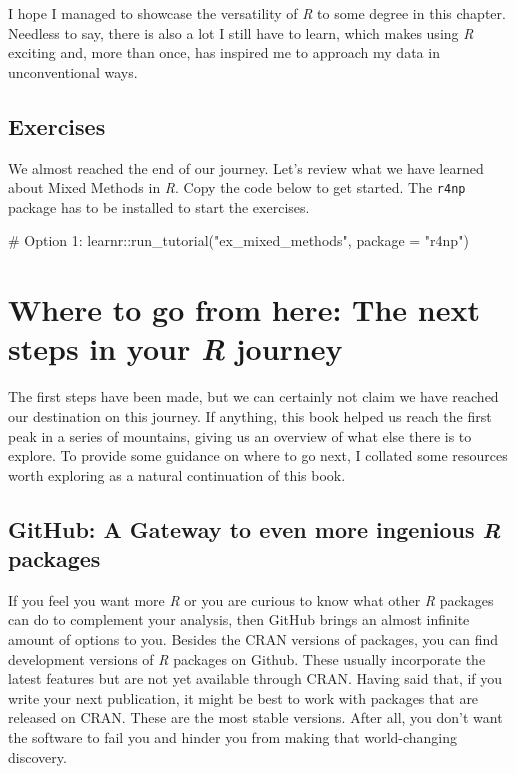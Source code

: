 \documentclass[
  letterpaper,
]{krantz}
\makeatletter
\newenvironment{Shaded}{\begin{snugshade}}{\end{snugshade}}
\newcommand{\AttributeTok}[1]{\textcolor[rgb]{0.40,0.45,0.13}{#1}}
\newcommand{\CommentTok}[1]{\textcolor[rgb]{0.37,0.37,0.37}{#1}}
\newcommand{\FunctionTok}[1]{\textcolor[rgb]{0.28,0.35,0.67}{#1}}
\newcommand{\NormalTok}[1]{\textcolor[rgb]{0.00,0.23,0.31}{#1}}
\newcommand{\SpecialCharTok}[1]{\textcolor[rgb]{0.37,0.37,0.37}{#1}}
\newcommand{\StringTok}[1]{\textcolor[rgb]{0.13,0.47,0.30}{#1}}
\newenvironment{kframe}{%
\medskip{}
\setlength{\fboxsep}{.8em}
 \def\at@end@of@kframe{}%
 \ifinner\ifhmode%
  \def\at@end@of@kframe{\end{minipage}}%
  \begin{minipage}{\columnwidth}%
 \fi\fi%
 \def\FrameCommand##1{\hskip\@totalleftmargin \hskip-\fboxsep
 \colorbox{shadecolor}{##1}\hskip-\fboxsep
     \hskip-\linewidth \hskip-\@totalleftmargin \hskip\columnwidth}%
 \MakeFramed {\advance\hsize-\width
   \@totalleftmargin\z@ \linewidth\hsize
   \@setminipage}}%
 {\par\unskip\endMakeFramed%
 \at@end@of@kframe}
\renewenvironment{Shaded}{\begin{kframe}}{\end{kframe}}
\makeatother
\begin{document}
I hope I managed to showcase the versatility of \emph{R} to some degree
in this chapter. Needless to say, there is also a lot I still have to
learn, which makes using \emph{R} exciting and, more than once, has
inspired me to approach my data in unconventional ways.

\section{Exercises}\label{sec-exercises-mixed-methods}

We almost reached the end of our journey. Let's review what we have
learned about Mixed Methods in \emph{R}. Copy the code below to get
started. The \texttt{r4np} package has to be installed to start the
exercises.

\begin{Shaded}
\begin{Highlighting}[]
\CommentTok{\# Option 1:}
\NormalTok{learnr}\SpecialCharTok{::}\FunctionTok{run\_tutorial}\NormalTok{(}\StringTok{"ex\_mixed\_methods"}\NormalTok{, }\AttributeTok{package =} \StringTok{"r4np"}\NormalTok{)}
\end{Highlighting}
\end{Shaded}


\chapter{\texorpdfstring{Where to go from here: The next steps in your
\emph{R}
journey}{Where to go from here: The next steps in your R journey}}\label{sec-next-steps}

The first steps have been made, but we can certainly not claim we have
reached our destination on this journey. If anything, this book helped
us reach the first peak in a series of mountains, giving us an overview
of what else there is to explore. To provide some guidance on where to
go next, I collated some resources worth exploring as a natural
continuation of this book.

\section{\texorpdfstring{GitHub: A Gateway to even more ingenious
\emph{R}
packages}{GitHub: A Gateway to even more ingenious R packages}}\label{sec-next-steps-github}

If you feel you want more \emph{R} or you are curious to know what other
\emph{R} packages can do to complement your analysis, then GitHub brings
an almost infinite amount of options to you. Besides the CRAN versions
of packages, you can find development versions of \emph{R} packages on
Github. These usually incorporate the latest features but are not yet
available through CRAN. Having said that, if you write your next
publication, it might be best to work with packages that are released on
CRAN. These are the most stable versions. After all, you don't want the
software to fail you and hinder you from making that world-changing
discovery.
\end{document}
